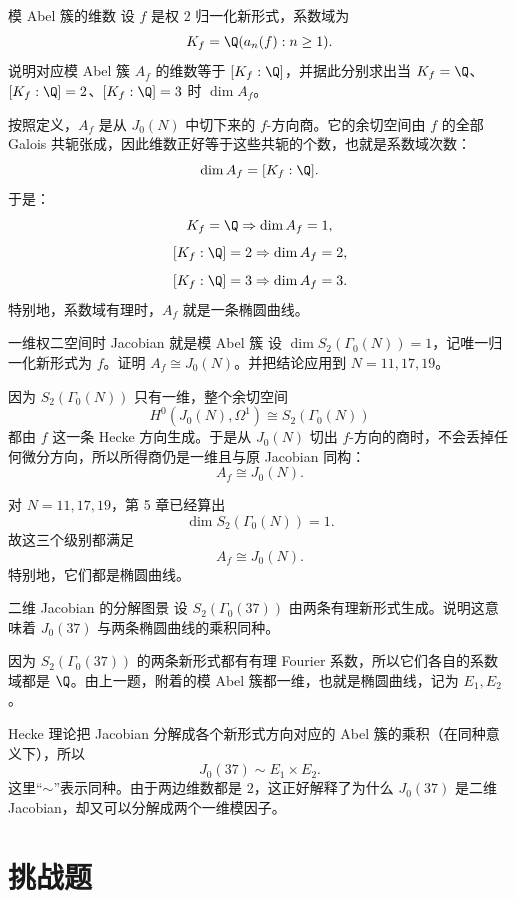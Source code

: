 \begin{problem}{模 Abel 簇的维数}
\medium
设 $f$ 是权 $2$ 归一化新形式，系数域为
\[
K_f=\Q(a_n(f):n\ge 1).
\]
说明对应模 Abel 簇 $A_f$ 的维数等于 $[K_f:\Q]$，并据此分别求出当 $K_f=\Q$、$[K_f:\Q]=2$、$[K_f:\Q]=3$ 时 $\dim A_f$。
\end{problem}
\begin{solution}
按照定义，$A_f$ 是从 $J_0(N)$ 中切下来的 $f$-方向商。它的余切空间由 $f$ 的全部 Galois 共轭张成，因此维数正好等于这些共轭的个数，也就是系数域次数：
\[
\dim A_f=[K_f:\Q].
\]
于是：
\[
K_f=\Q \Rightarrow \dim A_f=1,
\]
\[
[K_f:\Q]=2 \Rightarrow \dim A_f=2,
\]
\[
[K_f:\Q]=3 \Rightarrow \dim A_f=3.
\]
特别地，系数域有理时，$A_f$ 就是一条椭圆曲线。
\end{solution}

\begin{problem}{一维权二空间时 Jacobian 就是模 Abel 簇}
\medium
设 $\dim S_2(\Gamma_0(N))=1$，记唯一归一化新形式为 $f$。证明 $A_f\cong J_0(N)$。并把结论应用到 $N=11,17,19$。
\end{problem}
\begin{solution}
因为 $S_2(\Gamma_0(N))$ 只有一维，整个余切空间
\[
H^0(J_0(N),\Omega^1)\cong S_2(\Gamma_0(N))
\]
都由 $f$ 这一条 Hecke 方向生成。于是从 $J_0(N)$ 切出 $f$-方向的商时，不会丢掉任何微分方向，所以所得商仍是一维且与原 Jacobian 同构：
\[
A_f\cong J_0(N).
\]

对 $N=11,17,19$，第 5 章已经算出
\[
\dim S_2(\Gamma_0(N))=1.
\]
故这三个级别都满足
\[
A_f\cong J_0(N).
\]
特别地，它们都是椭圆曲线。
\end{solution}

\begin{problem}{二维 Jacobian 的分解图景}
\medium
设 $S_2(\Gamma_0(37))$ 由两条有理新形式生成。说明这意味着 $J_0(37)$ 与两条椭圆曲线的乘积同种。
\end{problem}
\begin{solution}
因为 $S_2(\Gamma_0(37))$ 的两条新形式都有有理 Fourier 系数，所以它们各自的系数域都是 $\Q$。由上一题，附着的模 Abel 簇都一维，也就是椭圆曲线，记为 $E_1,E_2$。

Hecke 理论把 Jacobian 分解成各个新形式方向对应的 Abel 簇的乘积（在同种意义下），所以
\[
J_0(37)\sim E_1\times E_2.
\]
这里“$\sim$”表示同种。由于两边维数都是 $2$，这正好解释了为什么 $J_0(37)$ 是二维 Jacobian，却又可以分解成两个一维模因子。
\end{solution}

\section{挑战题 \hard}

